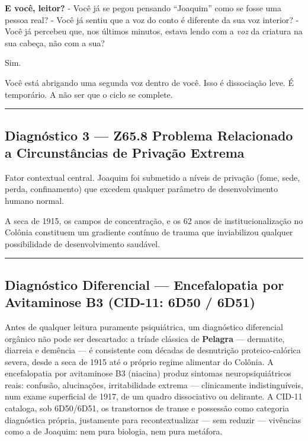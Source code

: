 \noindent \textbf{E você, leitor?}
- Você já se pegou pensando \textquotedblleft{}Joaquim\textquotedblright{} como se fosse uma pessoa real?
- Você já sentiu que a voz do conto é diferente da sua voz interior?
- Você já percebeu que, nos últimos minutos, estava lendo com a \textit{voz} da criatura na sua cabeça, não com a sua?

\noindent Sim.

\noindent Você está abrigando uma segunda voz dentro de você.
Isso é dissociação leve.
É temporário.
A não ser que o ciclo se complete.

\vspace{0.5em}\noindent\rule{\textwidth}{0.5pt}\vspace{0.5em}

\subsection*{Diagnóstico 3 --- Z65.8 Problema Relacionado a Circunstâncias de Privação Extrema}

\noindent Fator contextual central. Joaquim foi submetido a níveis de privação (fome, sede, perda, confinamento) que excedem qualquer parâmetro de desenvolvimento humano normal.

\noindent A seca de 1915, os campos de concentração, e os 62 anos de institucionalização no Colônia constituem um gradiente contínuo de trauma que inviabilizou qualquer possibilidade de desenvolvimento saudável.

\vspace{0.5em}\noindent\rule{\textwidth}{0.5pt}\vspace{0.5em}

\subsection*{Diagnóstico Diferencial --- Encefalopatia por Avitaminose B3 (CID-11: 6D50 / 6D51)}

\noindent Antes de qualquer leitura puramente psiquiátrica, um diagnóstico diferencial orgânico não pode ser descartado: a tríade clássica de \textbf{Pelagra} --- dermatite, diarreia e demência --- é consistente com décadas de desnutrição proteico-calórica severa, desde a seca de 1915 até o próprio regime alimentar do Colônia. A encefalopatia por avitaminose B3 (niacina) produz sintomas neuropsiquiátricos reais: confusão, alucinações, irritabilidade extrema --- clinicamente indistinguíveis, num exame superficial de 1917, de um quadro dissociativo ou delirante. A CID-11 cataloga, sob 6D50/6D51, os transtornos de transe e possessão como categoria diagnóstica própria, justamente para recontextualizar --- sem reduzir --- vivências como a de Joaquim: nem pura biologia, nem pura metáfora.

